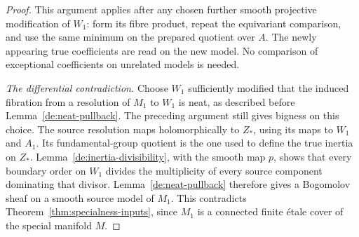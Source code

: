 \begin{proof}
This argument applies after any chosen further smooth projective modification
of \(W_1\): form its fibre product, repeat the equivariant
comparison, and use the same minimum on the prepared quotient over
\(A\). The newly appearing true coefficients are read on the new
model. No comparison of exceptional coefficients on unrelated models
is needed.

\medskip\noindent
\emph{The differential contradiction.}
Choose \(W_1\) sufficiently modified that the induced fibration
from a resolution of \(M_1\) to \(W_1\) is neat, as described
before Lemma~\ref{de:neat-pullback}. The preceding argument still
gives bigness on this choice. The source resolution maps holomorphically
to \(Z_*\), using its maps to \(W_1\) and \(A_1\). Its
fundamental-group quotient is the one used to define the true inertia
on \(Z_*\). Lemma~\ref{de:inertia-divisibility}, with the smooth
map \(p\), shows that every boundary order on \(W_1\) divides
the multiplicity of every source component dominating that divisor.
Lemma~\ref{de:neat-pullback} therefore gives a Bogomolov sheaf on a
smooth source model of \(M_1\). This contradicts
Theorem~\ref{thm:specialness-inputs}, since \(M_1\) is a connected
finite \'etale cover of the special manifold \(M\).
\end{proof}
